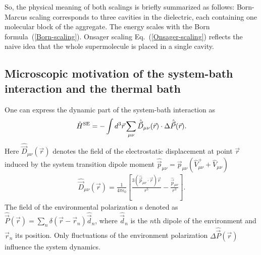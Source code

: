 \documentclass[12pt,twoside,a4paper]{report}
\begin{document}
So, the physical meaning of both scalings is briefly summarized as follows:
 Born-Marcus
scaling corresponds to three cavities in the dielectric, each
containing one molecular block of the aggregate. The energy scales 
with the Born formula~(\ref{Born-scaling}).
Onsager scaling Eq.~(\ref{Onsager-scaling}) reflects the naive idea that the whole
supermolecule is placed in a single cavity.  




\subsection{Microscopic motivation of the system-bath interaction and the thermal bath\label{chem-SB}}
One can express
the dynamic part of the system-bath interaction as
\begin{eqnarray}
\hat H
^{\rm SE}
           =    
                 -    \int d^3 \vec{r} 
                      \sum_{\mu{}\nu} 
                          \hat{\vec{D}}_{\mu{}\nu}(\vec r)
                          \cdot{}
                          \Delta 
                          \hat{\vec {P}}(\vec r).
\label{dynam-SB-inter}
\end{eqnarray}
Here $\hat{\vec {D}}_{\mu{}\nu}(\vec r)$ denotes the field of the
electrostatic displacement at point $\vec r$ induced by the system
transition dipole moment 
$\hat{\vec{p}}_{\mu{}\nu}
            =  \vec{p}_{\mu \nu}
               (\hat{V}^+_{\mu{}\nu}+\hat V_{\mu{}\nu} )$ \cite{l4}
\begin{eqnarray}
\hat{\vec{D}}_{\mu{}\nu}(\vec r)
             =  \frac{1}{4\pi\epsilon_0}
                \left[
                      \frac
                        {3(\hat{\vec{p}}_{\mu{}\nu} \cdot{}\vec{r}) \vec{r} }
                        {r^{5}}
                     -\frac
                        {\hat{\vec{p}}_{\mu{}\nu}}
                        {r^{3}}
                \right].
\label{dip-dip}
\end{eqnarray}
The field of the environmental polarization  s denoted as $\hat
{\vec{P}}(\vec{r}) = \sum_n \delta(\vec{r}-\vec{r}_n)
\hat{\vec{d}}_n$, where $ \hat{\vec{d}}_n$ is the $n$th 
dipole of the environment and $\vec r_n$ its position.
Only fluctuations of the environment polarization
$\Delta \hat{\vec{P}}(\vec r)$ influence the system dynamics.
\end{document}
